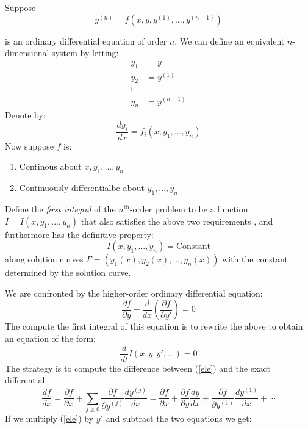 \begin{definition}Suppose
\begin{equation}
y^{(n)}=f(x,y,y^{(1)},...,y^{(n-1)})
\end{equation}

is an ordinary differential equation of order $n$. We can define an equivalent $n$-dimensional system by letting:
\begin{equation}
\begin{aligned}
y_1 &= y \\
y_2 &= y^{(1)} \\
\vdots \\
y_{n} &= y^{(n-1)}
\end{aligned}
\end{equation}
Denote by:
\begin{equation}
\frac{dy_i}{dx}=f_i(x,y_1,...,y_n)
\end{equation}
Now suppose $f$ is:

\begin{enumerate}
\item Continous about $x,y_1,...,y_n$
\item Continuously differentialbe about $y_1,...,y_n$
\end{enumerate}

Define  the \textit{first integral} of the $n^{\text{th}}$-order problem to be a function $I=I(x,y_1,...,y_n)$ that also satisfies the above two requirements , and furthermore has the definitive property:
\begin{equation}
I(x,y_1,...,y_n)=\text{Constant}
\end{equation}
along solution curves $\Gamma=(y_1(x),y_2(x),...,y_n(x))$ with the constant determined by the solution curve.

\end{definition}We are confronted by the higher-order ordinary differential equation:
\begin{equation}
\label{ele}
\frac{\partial f}{\partial y} -\frac{d}{dx}\left( \frac{\partial f}{\partial y'}\right)=0
\end{equation}
The compute the first integral of this equation is to rewrite the above to obtain an equation of the form:
\begin{equation}
\frac{d}{dt}I(x,y,y',...)=0
\end{equation}
The strategy is to compute the difference between (\ref{ele}) and the exact differential:
\begin{equation}
\frac{df}{dx}=\frac{\partial f}{\partial x} + \sum_{j\geq 0}\frac{\partial f}{\partial y^{(j)}}\frac{dy^{(j)}}{dx}=\frac{\partial f}{\partial x} +\frac{\partial f}{\partial y}\frac{dy}{dx}+\frac{\partial f}{\partial y^{(1)}}\frac{dy^{(1)}}{dx}+\cdots
\end{equation}
If we multiply (\ref{ele}) by $y'$ and subtract the two equations we get:

